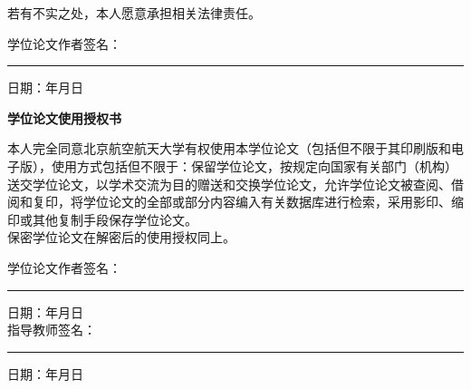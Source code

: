 \documentclass[a4paper,12pt，twoside]{ctexart}
\begin{document}
	若有不实之处，本人愿意承担相关法律责任。 \\[2em]
	
	\begin{flushleft}
		学位论文作者签名：\rule{5cm}{0.15mm} \hfill 日期：\hspace{1.5em}年\hspace{1.5em}月\hspace{1.5em}日
	\end{flushleft}
	
	\vspace{3em} %
	
	\begin{center}
		\bfseries 学位论文使用授权书 \\[2em]
	\end{center}
	
	\zihao{5}
	本人完全同意北京航空航天大学有权使用本学位论文（包括但不限于其印刷版和电子版），使用方式包括但不限于：保留学位论文，按规定向国家有关部门（机构）送交学位论文，以学术交流为目的赠送和交换学位论文，允许学位论文被查阅、借阅和复印，将学位论文的全部或部分内容编入有关数据库进行检索，采用影印、缩印或其他复制手段保存学位论文。 \\[1.5em]
	
	保密学位论文在解密后的使用授权同上。 \\[2em]
	
	\begin{flushleft}
		\zihao{5}
		学位论文作者签名：\rule{5cm}{0.15mm} \hfill 日期：\hspace{1.5em}年\hspace{1.5em}月\hspace{1.5em}日 \\[1em]
		指导教师签名：\rule{5cm}{0.15mm} \hfill 日期：\hspace{1.5em}年\hspace{1.5em}月\hspace{1.5em}日
	\end{flushleft}
	
	
	\newpage
	\pagestyle{plain}
\end{document}
